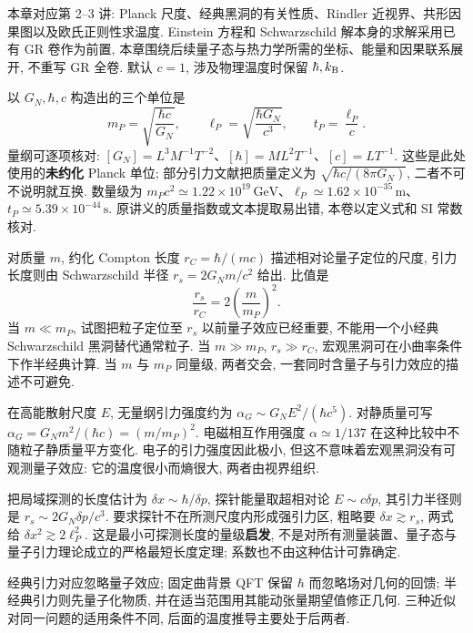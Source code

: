 \label{ch:holo-geometry-full}
本章对应第 2--3 讲: Planck 尺度、经典黑洞的有关性质、Rindler 近视界、共形因果图以及欧氏正则性求温度. Einstein 方程和 Schwarzschild 解本身的求解采用已有 GR 卷作为前置, 本章围绕后续量子态与热力学所需的坐标、能量和因果联系展开, 不重写 GR 全卷. 默认 $c=1$, 涉及物理温度时保留 $\hbar,k_{\mathrm B}$.

以 $G_N,\hbar,c$ 构造出的三个单位是
\[
m_P=\sqrt{\frac{\hbar c}{G_N}},\qquad
\ell_P=\sqrt{\frac{\hbar G_N}{c^3}},\qquad
t_P=\frac{\ell_P}c.
\]
量纲可逐项核对: $[G_N]=L^3M^{-1}T^{-2}$、$[\hbar]=ML^2T^{-1}$、$[c]=LT^{-1}$. 这些是此处使用的\textbf{未约化} Planck 单位; 部分引力文献把质量定义为 $\sqrt{\hbar c/(8\pi G_N)}$, 二者不可不说明就互换. 数量级为 $m_Pc^2\simeq1.22\times10^{19}\,\mathrm{GeV}$、$\ell_P\simeq1.62\times10^{-35}\,\mathrm m$、$t_P\simeq5.39\times10^{-44}\,\mathrm s$. 原讲义的质量指数或文本提取易出错, 本卷以定义式和 SI 常数核对.

对质量 $m$, 约化 Compton 长度 $r_C=\hbar/(mc)$ 描述相对论量子定位的尺度, 引力长度则由 Schwarzschild 半径 $r_s=2G_Nm/c^2$ 给出. 比值是
\[
\frac{r_s}{r_C}=2\left(\frac m{m_P}\right)^2.
\]
当 $m\ll m_P$, 试图把粒子定位至 $r_s$ 以前量子效应已经重要, 不能用一个小经典 Schwarzschild 黑洞替代通常粒子. 当 $m\gg m_P$, $r_s\gg r_C$, 宏观黑洞可在小曲率条件下作半经典计算. 当 $m$ 与 $m_P$ 同量级, 两者交会, 一套同时含量子与引力效应的描述不可避免.

在高能散射尺度 $E$, 无量纲引力强度约为 $\alpha_G\sim G_NE^2/(\hbar c^5)$. 对静质量可写 $\alpha_G=G_Nm^2/(\hbar c)=(m/m_P)^2$. 电磁相互作用强度 $\alpha\simeq1/137$ 在这种比较中不随粒子静质量平方变化. 电子的引力强度因此极小, 但这不意味着宏观黑洞没有可观测量子效应: 它的温度很小而熵很大, 两者由视界组织.

\begin{example}
把局域探测的长度估计为 $\delta x\sim\hbar/\delta p$, 探针能量取超相对论 $E\sim c\delta p$, 其引力半径则是 $r_s\sim2G_N\delta p/c^3$. 要求探针不在所测尺度内形成强引力区, 粗略要 $\delta x\gtrsim r_s$, 两式给 $\delta x^2\gtrsim2\ell_P^2$. 这是最小可探测长度的量级\textbf{启发}, 不是对所有测量装置、量子态与量子引力理论成立的严格最短长度定理; 系数也不由这种估计可靠确定.
\end{example}
经典引力对应忽略量子效应; 固定曲背景 QFT 保留 $\hbar$ 而忽略场对几何的回馈; 半经典引力则先量子化物质, 并在适当范围用其能动张量期望值修正几何. 三种近似对同一问题的适用条件不同, 后面的温度推导主要处于后两者.

